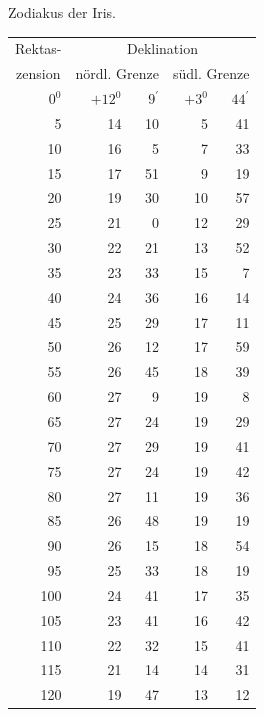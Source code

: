 \begin{center}
Zodiakus der Iris.
\end{center}
\begingroup\small
\setlength{\tabcolsep}{7pt}
\renewcommand{\arraystretch}{1.15}
\begin{center}
\begin{tabular}{|r|r@{\;}r|r@{\;}r|}
\multicolumn{1}{|c|}{Rektas-}&\multicolumn{4}{c|}{Deklination}\\
\multicolumn{1}{|c|}{zension}&\multicolumn{2}{c|}{nördl. Grenze}&\multicolumn{2}{c|}{südl. Grenze}\\
\(0^{0}\)&\(+12^{0}\)&\(9^{\prime}\)&\(+3^{0}\)&\(44^{\prime}\)\\
5&14&10&5&41\\
10&16&5&7&33\\
15&17&51&9&19\\
20&19&30&10&57\\
25&21&0&12&29\\
30&22&21&13&52\\
35&23&33&15&7\\
40&24&36&16&14\\
45&25&29&17&11\\
50&26&12&17&59\\
55&26&45&18&39\\
60&27&9&19&8\\
65&27&24&19&29\\
70&27&29&19&41\\
75&27&24&19&42\\
80&27&11&19&36\\
85&26&48&19&19\\
90&26&15&18&54\\
95&25&33&18&19\\
100&24&41&17&35\\
105&23&41&16&42\\
110&22&32&15&41\\
115&21&14&14&31\\
120&19&47&13&12\\\hline
\end{tabular}
\end{center}
